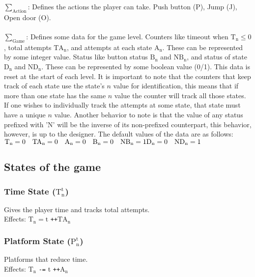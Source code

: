 \documentclass[10pt,twocolumn]{article}
\begin{document}
\noindent
$\sum_{\text{Action}}$: Defines the actions the player can take. Push button (P), Jump (J), Open door (O). \\\\

\noindent
$\sum_{\text{Game}}$: Defines some data for the game level. Counters like timeout when $\text{T}_{\text{n}} \leq 0$, total attempts $\text{TA}_{\text{n}}$, and attempts at each state $\text{A}_{\text{n}}$. These can be represented by some integer value. Status like button status $\text{B}_{\text{n}}$ and $\text{NB}_{\text{n}}$, and status of state $\text{D}_{\text{n}}$ and $\text{ND}_{\text{n}}$. These can be represented by some boolean value (0/1). This data is reset at the start of each level. It is important to note that the counters that keep track of each state use the state's $n$ value for identification, this means that if more than one state has the same $n$ value the counter will track all those states. If one wishes to individually track the attempts at some state, that state must have a unique $n$ value. Another behavior to note is that the value of any status prefixed with 'N' will be the inverse of its non-prefixed counterpart, this behavior, however, is up to the designer. The default values of the data are as follows: \\

\noindent
\begin{math}
  \text{T}_{\text{n}} =  0 \quad \text{TA}_{\text{n}} = 0 \quad \text{A}_{\text{n}} =  0 \quad
  \text{B}_{\text{n}} = 0 \quad \text{NB}_{\text{n}} = 1 \\ \text{D}_{\text{n}} = 0 \quad
  \text{ND}_{\text{n}} = 1
\end{math}

\subsection*{States of the game}
\subsubsection*{Time State ($\text{T}_{\text{n}}^{\text{t}}$)}
Gives the player time and tracks total attempts. \\
Effects: $\text{T}_{\text{n}} = \text{t}$ \quad \texttt{++}$\text{TA}_{\text{n}}$

\subsubsection*{Platform State ($\text{P}_{\text{n}}^{\text{t}}$)}
Platforms that reduce time. \\
Effects: $\text{T}_{\text{n}}$ \texttt{-=} t \quad \texttt{++}$\text{A}_{\text{n}}$
\end{document}
